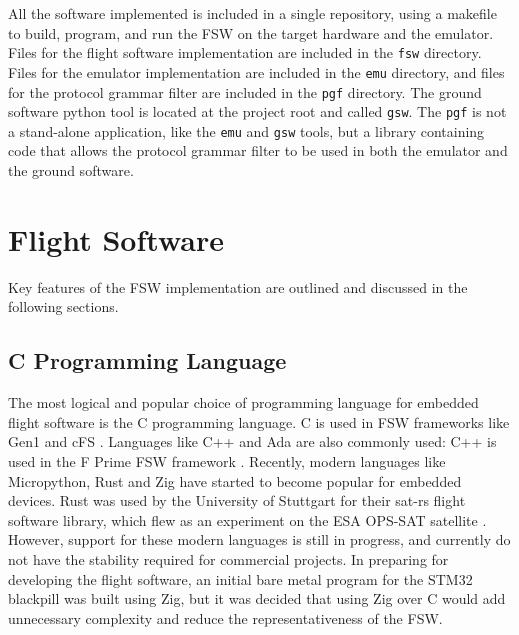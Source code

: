 \documentclass[../report.tex]{subfiles}
\begin{document}



All the software implemented is included in a single repository, using a
makefile to build, program, and run the FSW on the target hardware and the
emulator. Files for the flight software implementation are included in the
\lstinline|fsw| directory. Files for the emulator implementation are included
in the \lstinline|emu| directory, and files for the protocol grammar filter
are included in the \lstinline|pgf| directory. The ground software python tool
is located at the project root and called \lstinline|gsw|. The \lstinline|pgf| is
not a stand-alone application, like the \lstinline|emu| and \lstinline|gsw|
tools, but a library containing code that allows the protocol grammar filter to
be used in both the emulator and the ground software.

\section{Flight Software}

Key features of the FSW implementation are outlined and discussed in the
following sections.

\subsection{C Programming Language} %

The most logical and popular choice of programming language for embedded flight
software is the C programming language. C is used in FSW frameworks like Gen1
and cFS \citep{Bal_FSDK, Nasa_cFS}. Languages like C++ and Ada are also
commonly used: C++ is used in the F Prime FSW framework \citep{Nasa_fprime}.
Recently, modern languages like Micropython, Rust and Zig have started to
become popular for embedded devices. Rust was used by the University of
Stuttgart for their sat-rs flight software library, which flew as an experiment
on the ESA OPS-SAT satellite \citep{satrs, opsat}. However, support for these
modern languages is still in progress, and currently do not have the stability
required for commercial projects. In preparing for developing the flight
software, an initial bare metal program for the STM32 blackpill was built using
Zig, but it was decided that using Zig over C would add unnecessary complexity
and reduce the representativeness of the FSW.
\end{document}
